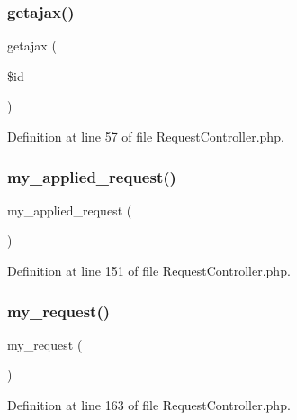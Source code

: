 \subsubsection{\texorpdfstring{getajax()}{getajax()}}
{\footnotesize\ttfamily getajax (\begin{DoxyParamCaption}\item[{}]{\$id }\end{DoxyParamCaption})}



Definition at line 57 of file Request\+Controller.\+php.

\mbox{\label{class_responsive_1_1_http_1_1_controllers_1_1_request_controller_a601d74e7d99aa15aee1f7ef56d640159}} 
\subsubsection{\texorpdfstring{my\_applied\_request()}{my\_applied\_request()}}
{\footnotesize\ttfamily my\+\_\+applied\+\_\+request (\begin{DoxyParamCaption}{ }\end{DoxyParamCaption})}



Definition at line 151 of file Request\+Controller.\+php.

\mbox{\label{class_responsive_1_1_http_1_1_controllers_1_1_request_controller_a93d834c295b873076ed53031e6b681ec}} 
\subsubsection{\texorpdfstring{my\_request()}{my\_request()}}
{\footnotesize\ttfamily my\+\_\+request (\begin{DoxyParamCaption}{ }\end{DoxyParamCaption})}



Definition at line 163 of file Request\+Controller.\+php.

\mbox{\label{class_responsive_1_1_http_1_1_controllers_1_1_request_controller_a2e2512ae637b42ad3d59325c726d7751}} 
